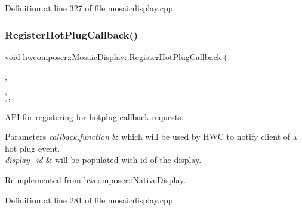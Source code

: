 Definition at line 327 of file mosaicdisplay.\+cpp.


\begin{DoxyCode}{0}
\end{DoxyCode}
\mbox{\label{classhwcomposer_1_1MosaicDisplay_a1d4f419cda4d1729dfb085f385a76afb}} 
\subsubsection{\texorpdfstring{Register\+Hot\+Plug\+Callback()}{RegisterHotPlugCallback()}}
{\footnotesize\ttfamily void hwcomposer\+::\+Mosaic\+Display\+::\+Register\+Hot\+Plug\+Callback (\begin{DoxyParamCaption}\item[{std\+::shared\+\_\+ptr$<$ \mbox{\hyperlink{classhwcomposer_1_1HotPlugCallback}{Hot\+Plug\+Callback}} $>$}]{,  }\item[{uint32\+\_\+t}]{ }\end{DoxyParamCaption})\hspace{0.3cm}{\ttfamily [override]}, {\ttfamily [virtual]}}

A\+PI for registering for hotplug callback requests. 
\begin{DoxyParams}{Parameters}
{\em callback,function} & which will be used by H\+WC to notify client of a hot plug event. \\
\hline
{\em display\+\_\+id} & will be populated with id of the display. \\
\hline
\end{DoxyParams}


Reimplemented from \mbox{\hyperlink{classhwcomposer_1_1NativeDisplay_a4080879c203571d6404ba3b3aff53631}{hwcomposer\+::\+Native\+Display}}.



Definition at line 281 of file mosaicdisplay.\+cpp.



